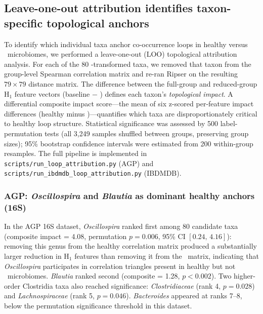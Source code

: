 \subsection{Leave-one-out attribution identifies taxon-specific topological anchors}
\label{subsec:attribution}

To identify which individual taxa anchor co-occurrence loops in healthy versus
\ibd\ microbiomes, we performed a leave-one-out (LOO) topological attribution
analysis.
For each of the 80 \clr-transformed taxa, we removed that taxon from the
group-level Spearman correlation matrix and re-ran Ripser on the resulting
$79 \times 79$ distance matrix.
The difference between the full-group and reduced-group H$_1$ feature vectors
(baseline $-$ \loo) defines each taxon's \emph{topological impact}.
A differential composite impact score---the mean of six z-scored per-feature
impact differences (healthy minus \ibd)---quantifies which taxa are
disproportionately critical to healthy loop structure.
Statistical significance was assessed by 500 label-permutation tests
(all 3,249 samples shuffled between groups, preserving group sizes);
95\% bootstrap confidence intervals were estimated from 200 within-group
resamples.
The full pipeline is implemented in \texttt{scripts/run\_loop\_attribution.py}
(AGP) and \texttt{scripts/run\_ibdmdb\_loop\_attribution.py} (IBDMDB).

\subsubsection*{AGP: \textit{Oscillospira} and \textit{Blautia} as dominant
healthy anchors (16S)}

In the AGP 16S dataset, \textit{Oscillospira} ranked first among 80 candidate
taxa (composite impact = 4.08, permutation $p = 0.006$,
95\% CI $[0.24,\,4.16]$): removing this genus from the healthy correlation
matrix produced a substantially larger reduction in H$_1$ features than
removing it from the \ibd\ matrix, indicating that \textit{Oscillospira}
participates in correlation triangles present in healthy but not \ibd\
microbiomes.
\textit{Blautia} ranked second (composite = 1.28, $p < 0.002$).
Two higher-order Clostridia taxa also reached significance:
\textit{Clostridiaceae} (rank 4, $p = 0.028$) and
\textit{Lachnospiraceae} (rank 5, $p = 0.046$).
\textit{Bacteroides} appeared at ranks 7--8, below the permutation
significance threshold in this dataset.

